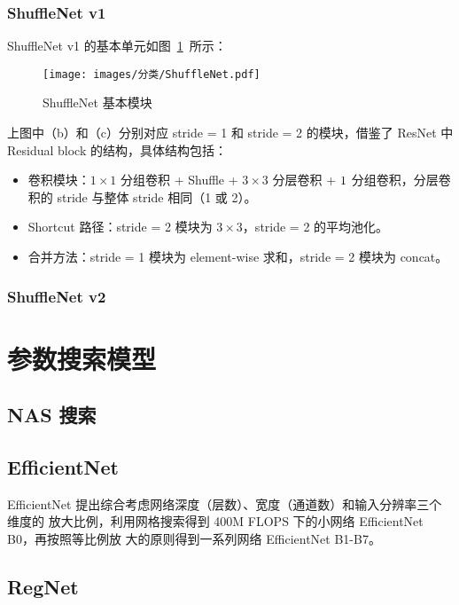 \subsection{ShuffleNet v1}
ShuffleNet v1 的基本单元如图~\ref{fig:shufflenet}~所示：

\begin{figure}[ht]
  \centering
  \texttt{[image: images/分类/ShuffleNet.pdf]}
  \caption{ShuffleNet 基本模块}
  \label{fig:shufflenet}
\end{figure}

上图中（b）和（c）分别对应 stride = 1 和 stride = 2 的模块，借鉴了 ResNet 中
Residual block 的结构，具体结构包括：

\begin{itemize}
  \item 卷积模块：$1 \times 1$ 分组卷积 + Shuffle + $3 \times 3$ 分层卷积 + $1
    \time 1$ 分组卷积，分层卷积的 stride 与整体 stride 相同（1 或 2）。
  \item Shortcut 路径：stride = 2 模块为 $3 \times 3$，stride = 2 的平均池化。
  \item 合并方法：stride = 1 模块为 element-wise 求和，stride = 2 模块为 concat。
\end{itemize}

\subsection{ShuffleNet v2}

\chapter{参数搜索模型}

\section{NAS 搜索}

\section{EfficientNet}
EfficientNet 提出综合考虑网络深度（层数）、宽度（通道数）和输入分辨率三个维度的
放大比例，利用网格搜索得到 400M FLOPS 下的小网络 EfficientNet B0，再按照等比例放
大的原则得到一系列网络 EfficientNet B1-B7。

\section{RegNet}


